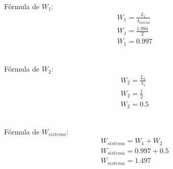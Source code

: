 \documentclass[12pt,a4paper]{article}
\begin{document}
\noindent
\\
Fórmula de \(W_{1}\):
\begin{equation*}
	\begin{aligned}
		&W_{1} = \frac{L_{1}}{\lambda_{inicial}} \\
		&W_{1} = \frac{1.994}{2} \\
		&W_{1} = 0.997
	\end{aligned}
\end{equation*}

\noindent
\\
Fórmula de \(W_{2}\):
\begin{equation*}
	\begin{aligned}
		&W_{2} = \frac{L_{2}}{\lambda_{1}} \\
		&W_{2} = \frac{1}{2} \\
		&W_{2} = 0.5
	\end{aligned}
\end{equation*}

\noindent
\\
Fórmula de \(W_{sistema}\):
\begin{equation*}
	\begin{aligned}
		&W_{sistema} = W_{1} + W_{2} \\
		&W_{sistema} = 0.997 + 0.5 \\
		&W_{sistema} = 1.497
	\end{aligned}
\end{equation*}


\end{document}
